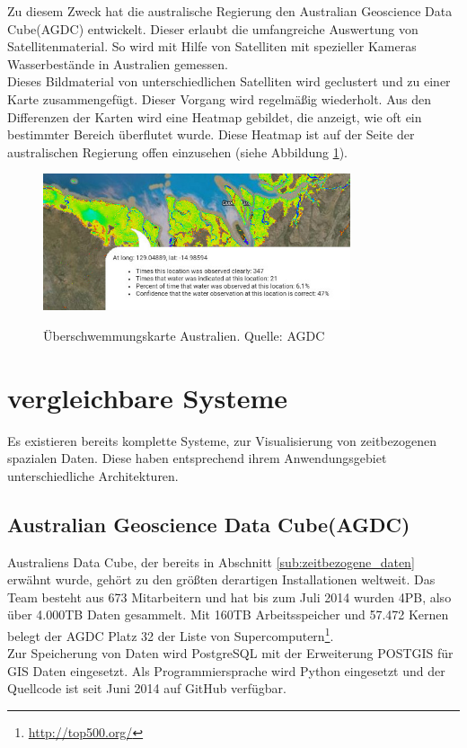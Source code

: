 \documentclass[10pt,conference,compsocconf]{IEEEtran}
\begin{document}
Zu diesem Zweck hat die australische Regierung den Australian Geoscience Data Cube(AGDC) entwickelt. Dieser erlaubt die umfangreiche Auswertung von Satellitenmaterial. So wird mit Hilfe von Satelliten mit spezieller Kameras Wasserbestände in Australien gemessen.\\
Dieses Bildmaterial von unterschiedlichen Satelliten wird geclustert und zu einer Karte zusammengefügt. Dieser Vorgang wird regelmäßig wiederholt. Aus den Differenzen der Karten wird eine Heatmap gebildet, die anzeigt, wie oft ein bestimmter Bereich überflutet wurde. Diese Heatmap ist auf der Seite der australischen Regierung offen einzusehen (siehe Abbildung \ref{img:agcd_flood}).

\begin{figure}[H]
  \centering
  	\includegraphics[height=114pt]{img/agcd_flood}\\
  \caption[]{Überschwemmungskarte Australien. Quelle: AGDC\footnotemark}
  \label{img:agcd_flood}
\end{figure}


\section{vergleichbare Systeme}
Es existieren bereits komplette Systeme, zur Visualisierung von zeitbezogenen spazialen Daten. Diese haben entsprechend ihrem Anwendungsgebiet unterschiedliche Architekturen.

\subsection{Australian Geoscience Data Cube(AGDC)}
Australiens Data Cube, der bereits in Abschnitt \ref{sub:zeitbezogene_daten} erwähnt wurde, gehört zu den größten derartigen Installationen weltweit. Das Team besteht aus 673 Mitarbeitern und hat bis zum Juli 2014 wurden 4PB, also über 4.000TB Daten gesammelt\cite{agdc}. Mit 160TB Arbeitsspeicher und 57.472 Kernen belegt der AGDC Platz 32 der Liste von Supercomputern\footnote{\url{http://top500.org/}}.\\
Zur Speicherung von Daten wird PostgreSQL mit der Erweiterung POSTGIS für GIS Daten eingesetzt. Als Programmiersprache wird Python eingesetzt und der Quellcode ist seit Juni 2014 auf GitHub verfügbar.\par
\end{document}
